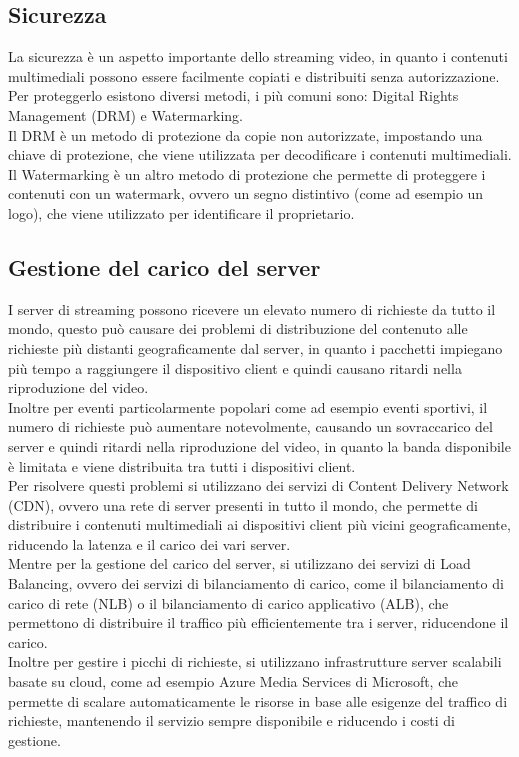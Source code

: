 \subsection{Sicurezza}
La sicurezza è un aspetto importante dello streaming video, in quanto i contenuti multimediali possono essere facilmente copiati e distribuiti senza autorizzazione.
Per proteggerlo esistono diversi metodi, i più comuni sono: Digital Rights Management (DRM) e Watermarking.\\
Il DRM è un metodo di protezione da copie non autorizzate, impostando una chiave di protezione, che viene utilizzata per decodificare i contenuti multimediali.\\
Il Watermarking è un altro metodo di protezione che permette di proteggere i contenuti con un watermark, ovvero un segno distintivo (come ad esempio un logo), 
che viene utilizzato per identificare il proprietario.\\

\subsection{Gestione del carico del server}
I server di streaming possono ricevere un elevato numero di richieste da tutto il mondo, questo può causare dei problemi di distribuzione del contenuto 
alle richieste più distanti geograficamente dal server, in quanto i pacchetti impiegano più tempo a raggiungere il dispositivo client e quindi causano ritardi nella riproduzione del video.\\
Inoltre per eventi particolarmente popolari come ad esempio eventi sportivi, il numero di richieste può aumentare notevolmente, causando un sovraccarico del server e quindi ritardi nella riproduzione
del video, in quanto la banda disponibile è limitata e viene distribuita tra tutti i dispositivi client.\\
Per risolvere questi problemi si utilizzano dei servizi di Content Delivery Network (CDN), ovvero una rete di server presenti in tutto il mondo, che permette di distribuire i contenuti multimediali
ai dispositivi client più vicini geograficamente, riducendo la latenza e il carico dei vari server.\\
Mentre per la gestione del carico del server, si utilizzano dei servizi di Load Balancing, ovvero dei servizi di bilanciamento di carico, come il bilanciamento di carico di rete (NLB) o il 
bilanciamento di carico applicativo (ALB), che permettono di distribuire il traffico più efficientemente tra i server, riducendone il carico.\\
Inoltre per gestire i picchi di richieste, si utilizzano infrastrutture server scalabili basate su cloud, come ad esempio Azure Media Services di Microsoft, che permette di scalare automaticamente le risorse 
in base alle esigenze del traffico di richieste, mantenendo il servizio sempre disponibile e riducendo i costi di gestione.\\

